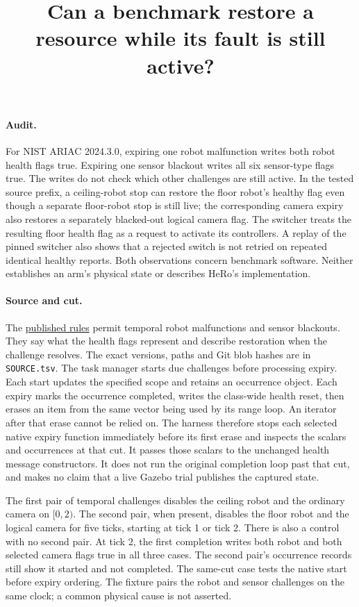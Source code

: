 \documentclass{article}
\begin{document}
\title{Can a benchmark restore a resource while its fault is still active?}
\maketitle

\paragraph{Audit.}
For NIST ARIAC 2024.3.0, expiring one robot malfunction writes both
robot health flags true. Expiring one sensor blackout writes all six
sensor-type flags true. The writes do not check which other challenges
are still active. In the tested source prefix, a ceiling-robot stop can
restore the floor robot's healthy flag even though a separate floor-robot
stop is still live; the corresponding camera expiry also restores a
separately blacked-out logical camera flag. The switcher treats the
resulting floor health flag as a request to activate its controllers.
A replay of the pinned switcher also shows that a rejected switch is not
retried on repeated identical healthy reports. Both observations concern
benchmark software. Neither establishes an arm's physical state or
describes HeRo's implementation.

\paragraph{Source and cut.}
The \href{https://pages.nist.gov/ARIAC_docs/en/2024.1.0/competition/challenges.html}{published
rules} permit temporal robot malfunctions and sensor blackouts. They say
what the health flags represent and describe restoration when the
challenge resolves. The exact versions, paths and Git blob hashes are
in \texttt{SOURCE.tsv}. The task manager starts due challenges before
processing expiry. Each start updates the specified scope and retains an
occurrence object. Each expiry marks the occurrence completed, writes the
class-wide health reset, then erases an item from the same vector being
used by its range loop. An iterator after that erase cannot be relied on.
The harness therefore stops each selected native expiry function
immediately before its first erase and inspects the scalars and
occurrences at that cut. It passes those scalars to the unchanged health
message constructors. It does not run the original completion loop past
that cut, and makes no claim that a live Gazebo trial publishes the
captured state.

The first pair of temporal challenges disables the ceiling robot and the
ordinary camera on \([0,2)\). The second pair, when present, disables the
floor robot and the logical camera for five ticks, starting at tick 1
or tick 2. There is also a control with no second pair. At tick 2, the
first completion writes both robot and both selected camera flags true
in all three cases. The second pair's occurrence records still show it
started and not completed. The same-cut case tests the native start
before expiry ordering. The fixture pairs the robot and sensor
challenges on the same clock; a common physical cause is not asserted.
\end{document}
